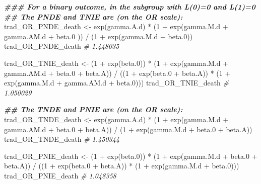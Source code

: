 \documentclass[
]{book}
\newenvironment{Shaded}{\begin{snugshade}}{\end{snugshade}}
\newcommand{\CommentTok}[1]{\textcolor[rgb]{0.56,0.35,0.01}{\textit{#1}}}
\newcommand{\DecValTok}[1]{\textcolor[rgb]{0.00,0.00,0.81}{#1}}
\newcommand{\DocumentationTok}[1]{\textcolor[rgb]{0.56,0.35,0.01}{\textbf{\textit{#1}}}}
\newcommand{\FloatTok}[1]{\textcolor[rgb]{0.00,0.00,0.81}{#1}}
\newcommand{\FunctionTok}[1]{\textcolor[rgb]{0.00,0.00,0.00}{#1}}
\newcommand{\NormalTok}[1]{#1}
\newcommand{\OtherTok}[1]{\textcolor[rgb]{0.56,0.35,0.01}{#1}}
\newcommand{\SpecialCharTok}[1]{\textcolor[rgb]{0.00,0.00,0.00}{#1}}
\begin{document}
\begin{Shaded}
\begin{Highlighting}[]
\DocumentationTok{\#\#\# For a binary outcome, in the subgroup with L(0)=0 and L(1)=0}
\DocumentationTok{\#\# The PNDE and TNIE are (on the OR scale):}
\NormalTok{trad\_OR\_PNDE\_death }\OtherTok{\textless{}{-}} \FunctionTok{exp}\NormalTok{(gamma.A.d) }\SpecialCharTok{*}
\NormalTok{  (}\DecValTok{1} \SpecialCharTok{+} \FunctionTok{exp}\NormalTok{(gamma.M.d }\SpecialCharTok{+}\NormalTok{ gamma.AM.d }\SpecialCharTok{+}\NormalTok{ beta}\FloatTok{.0}\NormalTok{ )) }\SpecialCharTok{/}
\NormalTok{  (}\DecValTok{1} \SpecialCharTok{+} \FunctionTok{exp}\NormalTok{(gamma.M.d }\SpecialCharTok{+}\NormalTok{ beta}\FloatTok{.0}\NormalTok{))}
\NormalTok{trad\_OR\_PNDE\_death}
\CommentTok{\# 1.448035}

\NormalTok{trad\_OR\_TNIE\_death }\OtherTok{\textless{}{-}}\NormalTok{ (}\DecValTok{1} \SpecialCharTok{+} \FunctionTok{exp}\NormalTok{(beta}\FloatTok{.0}\NormalTok{)) }\SpecialCharTok{*}
\NormalTok{  (}\DecValTok{1} \SpecialCharTok{+} \FunctionTok{exp}\NormalTok{(gamma.M.d }\SpecialCharTok{+}\NormalTok{ gamma.AM.d }\SpecialCharTok{+}\NormalTok{ beta}\FloatTok{.0} \SpecialCharTok{+}\NormalTok{ beta.A)) }\SpecialCharTok{/}
\NormalTok{  ((}\DecValTok{1} \SpecialCharTok{+} \FunctionTok{exp}\NormalTok{(beta}\FloatTok{.0} \SpecialCharTok{+}\NormalTok{ beta.A)) }\SpecialCharTok{*}\NormalTok{ (}\DecValTok{1} \SpecialCharTok{+} \FunctionTok{exp}\NormalTok{(gamma.M.d }\SpecialCharTok{+}\NormalTok{ gamma.AM.d }\SpecialCharTok{+}\NormalTok{ beta}\FloatTok{.0}\NormalTok{)))}
\NormalTok{trad\_OR\_TNIE\_death}
\CommentTok{\# 1.050029}

\DocumentationTok{\#\# The TNDE and PNIE are (on the OR scale):}
\NormalTok{trad\_OR\_TNDE\_death }\OtherTok{\textless{}{-}} \FunctionTok{exp}\NormalTok{(gamma.A.d) }\SpecialCharTok{*}
\NormalTok{  (}\DecValTok{1} \SpecialCharTok{+} \FunctionTok{exp}\NormalTok{(gamma.M.d }\SpecialCharTok{+}\NormalTok{ gamma.AM.d }\SpecialCharTok{+}\NormalTok{ beta}\FloatTok{.0} \SpecialCharTok{+}\NormalTok{ beta.A)) }\SpecialCharTok{/}
\NormalTok{  (}\DecValTok{1} \SpecialCharTok{+} \FunctionTok{exp}\NormalTok{(gamma.M.d }\SpecialCharTok{+}\NormalTok{ beta}\FloatTok{.0} \SpecialCharTok{+}\NormalTok{ beta.A))}
\NormalTok{trad\_OR\_TNDE\_death}
\CommentTok{\# 1.450344}

\NormalTok{trad\_OR\_PNIE\_death }\OtherTok{\textless{}{-}}\NormalTok{ (}\DecValTok{1} \SpecialCharTok{+} \FunctionTok{exp}\NormalTok{(beta}\FloatTok{.0}\NormalTok{)) }\SpecialCharTok{*}
\NormalTok{  (}\DecValTok{1} \SpecialCharTok{+} \FunctionTok{exp}\NormalTok{(gamma.M.d }\SpecialCharTok{+}\NormalTok{ beta}\FloatTok{.0} \SpecialCharTok{+}\NormalTok{ beta.A)) }\SpecialCharTok{/}
\NormalTok{  ((}\DecValTok{1} \SpecialCharTok{+} \FunctionTok{exp}\NormalTok{(beta}\FloatTok{.0} \SpecialCharTok{+}\NormalTok{ beta.A)) }\SpecialCharTok{*}\NormalTok{ (}\DecValTok{1} \SpecialCharTok{+} \FunctionTok{exp}\NormalTok{(gamma.M.d }\SpecialCharTok{+}\NormalTok{ beta}\FloatTok{.0}\NormalTok{)))}
\NormalTok{trad\_OR\_PNIE\_death}
\CommentTok{\# 1.048358}
\end{Highlighting}
\end{Shaded}
\end{document}
